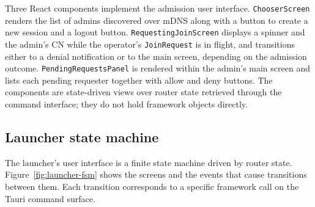 \documentclass[11pt,a4paper]{article}
\begin{document}
Three React components implement the admission user interface.
\texttt{ChooserScreen} renders the list of admins discovered over
mDNS along with a button to create a new session and a logout
button. \texttt{RequestingJoinScreen} displays a spinner and the
admin's CN while the operator's \texttt{JoinRequest} is in
flight, and transitions either to a denial notification or to the
main screen, depending on the admission outcome.
\texttt{PendingRequestsPanel} is rendered within the admin's main
screen and lists each pending requester together with allow and
deny buttons. The components are state-driven views over router
state retrieved through the command interface; they do not hold
framework objects directly.

\subsection{Launcher state machine}

The launcher's user interface is a finite state machine driven by
router state. Figure~\ref{fig:launcher-fsm} shows the screens and
the events that cause transitions between them. Each transition
corresponds to a specific framework call on the Tauri command
surface.
\end{document}
